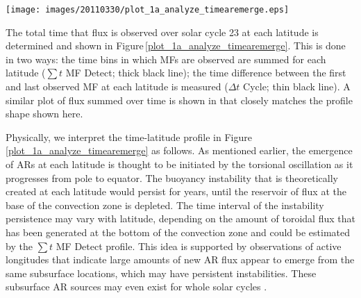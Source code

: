 \documentclass[namedreferences]{solarphysics}
\begin{document}
\begin{article}
\begin{figure*}[!t]
 
\texttt{[image: images/20110330/plot\_1a\_analyze\_timearemerge.eps]}
\caption{The amount of time that flux is observed to emerge at each latitude. This is measured both by counting the bins in which MFs are observed at each latitude bin ($\sum t$ MF Detect; thick black line) and by measuring the time difference between the first and last observed MF at each latitude bin of cycle 23 ($\Delta t$ Cycle; thin black line). For comparison, $\sum \Phi_{\mathrm{TOT}}$ is over-plotted; this is the flux (averaged over each time bin) summed over all times at each latitude bin (gray line).}\label{plot_1a_analyze_timearemerge}
\end{figure*}


The total time that flux is observed over solar cycle 23 at each latitude is determined and shown in  Figure\,\ref{plot_1a_analyze_timearemerge}. This is done in two ways: the time bins in which MFs are observed are summed for each latitude ($\sum t$ MF Detect; thick black line); the time difference between the first and last observed MF at each latitude is measured ($\Delta t$ Cycle; thin black line). A similar plot of flux summed over time is shown in \citet{jin:2012} that closely matches the profile shape shown here. %


Physically, we interpret the time-latitude profile in Figure\,\ref{plot_1a_analyze_timearemerge} as follows.
As mentioned earlier, the emergence of ARs at each latitude is thought to be initiated by the torsional oscillation as it progresses from pole to equator. The buoyancy instability that is theoretically created at each latitude would persist for years, until the reservoir of flux at the base of the convection zone is depleted. The time interval of the instability persistence may vary with latitude, depending on the amount of toroidal flux that has been generated at the bottom of the convection zone and could be estimated by the $\sum t$ MF Detect profile. This idea is supported by observations of active longitudes \citep{Gaizauskas:1983, chen:2011} that indicate large amounts of new AR flux appear to emerge from the same subsurface locations, which may have persistent instabilities. These subsurface AR sources may even exist for whole solar cycles \citep{Henney:2002, Berdyugina:2003}.


\end{article}
\end{document}
